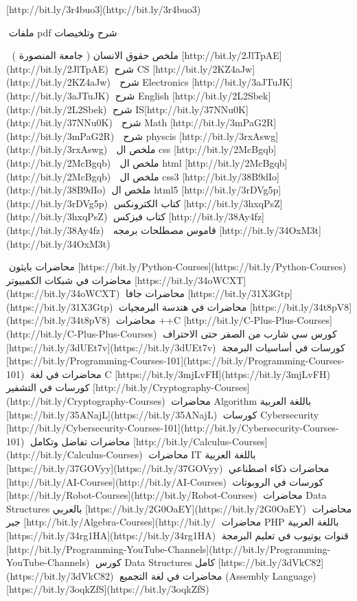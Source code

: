     [http://bit.ly/3r4buo3](http://bit.ly/3r4buo3)
    
    🌷ملفات pdf شرح وتلخيصات
    
    🥀 ملخص حقوق الانسان ( جامعة المنصورة )
    [http://bit.ly/2JlTpAE](http://bit.ly/2JlTpAE)
    🥀شرح CS
    [http://bit.ly/2KZ4aJw](http://bit.ly/2KZ4aJw)
    🥀 شرح Electronics
    [http://bit.ly/3aJTuJK](http://bit.ly/3aJTuJK)
    🥀شرح English
    [http://bit.ly/2L2Sbek](http://bit.ly/2L2Sbek)
    🥀شرح IS[http://bit.ly/37NNu0K](http://bit.ly/37NNu0K)
    🥀 شرح Math
    [http://bit.ly/3mPaG2R](http://bit.ly/3mPaG2R)
    🥀 شرح physcis
    [http://bit.ly/3rxAswg](http://bit.ly/3rxAswg)
    🥀 ملخص ال css
    [http://bit.ly/2McBgqb](http://bit.ly/2McBgqb)
    🥀 ملخص ال html
    [http://bit.ly/2McBgqb](http://bit.ly/2McBgqb)
    🥀 ملخص ال css3
    [http://bit.ly/38B9dIo](http://bit.ly/38B9dIo)
    🥀ملخص ال html5
    [http://bit.ly/3rDVg5p](http://bit.ly/3rDVg5p)
    🥀كتاب الكترونكس
    [http://bit.ly/3hxqPsZ](http://bit.ly/3hxqPsZ)
    🥀كتاب فيزكس
    [http://bit.ly/38Ay4fz](http://bit.ly/38Ay4fz)
    🥀 قاموس مصطلحات برمجه
    [http://bit.ly/34OxM3t](http://bit.ly/34OxM3t)
    
    🥀محاضرات بايثون
    [https://bit.ly/Python-Courses](https://bit.ly/Python-Courses)
    🥀محاضرات في شبكات الكمبيوتر
    [https://bit.ly/34oWCXT](https://bit.ly/34oWCXT)
    🥀محاضرات جافا
    [https://bit.ly/31X3Gtp](https://bit.ly/31X3Gtp)
    🥀محاضرات في هندسة البرمجيات
    [https://bit.ly/34t8pV8](https://bit.ly/34t8pV8)
    🥀محاضرات ++C
    [http://bit.ly/C-Plus-Plus-Courses](http://bit.ly/C-Plus-Plus-Courses)
    🥀كورس سي شارب من الصفر حتى الاحتراف
    [https://bit.ly/3dUEt7v](https://bit.ly/3dUEt7v)
    🥀كورسات في أساسيات البرمجة
    [https://bit.ly/Programming-Courses-101](https://bit.ly/Programming-Courses-101)
    🥀محاضرات في لغة C
    [https://bit.ly/3mjLvFH](https://bit.ly/3mjLvFH)
    🥀كورسات في التشفير
    [http://bit.ly/Cryptography-Courses](http://bit.ly/Cryptography-Courses)
    🥀محاضرات Algorithm باللغة العربية
    [https://bit.ly/35ANajL](https://bit.ly/35ANajL)
    🥀كورسات Cybersecurity
    [http://bit.ly/Cybersecurity-Courses-101](http://bit.ly/Cybersecurity-Courses-101)
    🥀محاضرات تفاضل وتكامل
    [http://bit.ly/Calculus-Courses](http://bit.ly/Calculus-Courses)
    🥀محاضرات IT باللغة العربية
    [https://bit.ly/37GOVyy](https://bit.ly/37GOVyy)
    🥀محاضرات ذكاء اصطناعي
    [http://bit.ly/AI-Courses](http://bit.ly/AI-Courses)
    🥀كورسات في الروبوتات
    [http://bit.ly/Robot-Courses](http://bit.ly/Robot-Courses)
    🥀محاضرات Data Structures بالعربي
    [https://bit.ly/2G0OaEY](https://bit.ly/2G0OaEY)
    🥀محاضرات جبر
    [http://bit.ly/ِAlgebra-Courses](http://bit.ly/%
    🥀محاضرات PHP باللغة العربية
    [https://bit.ly/34rg1HA](https://bit.ly/34rg1HA)
    🥀قنوات يوتيوب في تعليم البرمجة
    [http://bit.ly/Programming-YouTube-Channels](http://bit.ly/Programming-YouTube-Channels)
    🥀كورس Data Structures كامل
    [https://bit.ly/3dVkC82](https://bit.ly/3dVkC82)
    🥀محاضرات في لغة التجميع (Assembly Language)
    [https://bit.ly/3oqkZfS](https://bit.ly/3oqkZfS)
    
